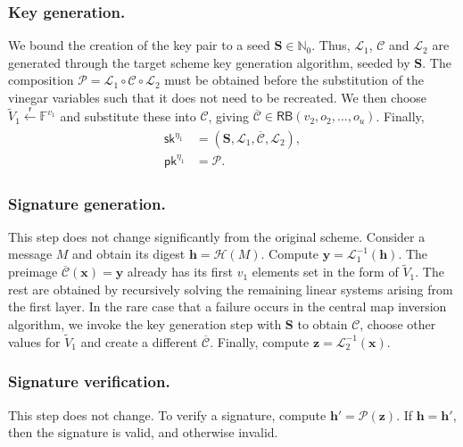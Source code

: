 \documentclass[12pt, a4paper, oneside]{memoir}
\newcommand{\random}{\overset{\mathsf{r}}{\gets}}
\theoremstyle{definition}
\begin{document}
\subsubsection{Key generation.}

We bound the creation of the key pair to a seed $\mathbf{S} \in \mathbb{N}_{0}$. Thus, $\mathcal{L}_{1}$, $\mathcal{C}$ and $\mathcal{L}_{2}$ are generated through the target scheme key generation algorithm, seeded by $\mathbf{S}$. The composition $\mathcal{P} = \mathcal{L}_{1} \circ \mathcal{C} \circ \mathcal{L}_{2}$ must be obtained before the substitution of the vinegar variables such that it does not need to be recreated. We then choose $\widetilde{V}_{1} \random \mathbb{F}^{v_{1}}$ and substitute these into $\mathcal{C}$, giving $\overline{\mathcal{C}} \in \mathsf{RB}(v_{2}, o_{2}, \dots, o_{u})$. Finally,
\begin{align}
  \begin{split}
    \mathsf{sk}^{\eta_{1}} &= (\mathbf{S}, \mathcal{L}_{1}, \overline{\mathcal{C}}, \mathcal{L}_{2}), \\
    \mathsf{pk}^{\eta_{1}} &= \mathcal{P}.
  \end{split}
\end{align}

\subsubsection{Signature generation.}

This step does not change significantly from the original scheme. Consider a message $M$ and obtain its digest $\mathbf{h} = \mathcal{H}(M)$. Compute $\mathbf{y} = \mathcal{L}_{1}^{-1}(\mathbf{h})$. The preimage $\overline{\mathcal{C}}(\mathbf{x}) = \mathbf{y}$ already has its first $v_{1}$ elements set in the form of $\widetilde{V}_{1}$. The rest are obtained by recursively solving the remaining linear systems arising from the first layer. In the rare case that a failure occurs in the central map inversion algorithm, we invoke the key generation step with $\mathbf{S}$ to obtain $\mathcal{C}$, choose other values for $\widetilde{V}_{1}$ and create a different $\overline{\mathcal{C}}$. Finally, compute $\mathbf{z} = \mathcal{L}_{2}^{-1}(\mathbf{x})$.

\subsubsection{Signature verification.}

This step does not change. To verify a signature, compute $\mathbf{h'} = \mathcal{P}(\mathbf{z})$. If $\mathbf{h} = \mathbf{h'}$, then the signature is valid, and otherwise invalid.
\end{document}
